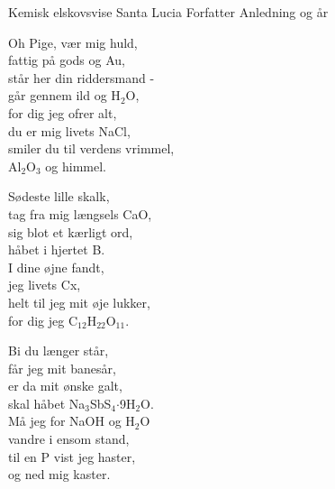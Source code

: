\begin{song}{Kemisk elskovsvise}
  {} %
  {Santa Lucia} %
  {Forfatter} %
  {Anledning og år} %
  {\NotCCLIed} %

  \begin{SBVerse}
    Oh Pige, vær mig huld,\\
    fattig på gods og Au,\\
    står her din riddersmand - \\
    går gennem ild og H$_2$O,\\
    for dig jeg ofrer alt,\\
    du er mig livets NaCl,\\
    smiler du til verdens vrimmel,\\
    Al$_2$O$_3$ og himmel.
  \end{SBVerse}

  \begin{SBVerse}
    Sødeste lille skalk,\\
    tag fra mig længsels CaO,\\
    sig blot et kærligt ord,\\
    håbet i hjertet B.\\
    I dine øjne fandt,\\
    jeg livets Cx,\\
    helt til jeg mit øje lukker,\\
    for dig jeg C$_{12}$H$_{22}$O$_{11}$.
  \end{SBVerse}

  \begin{SBVerse}
    Bi du længer står,\\
    får jeg mit banesår,\\
    er da mit ønske galt,\\
    skal håbet Na$_3$SbS$_4$$\cdot$9H$_2$O.\\
    Må jeg for NaOH og H$_2$O\\
    vandre i ensom stand,\\
    til en P vist jeg haster,\\
    og ned mig kaster.
  \end{SBVerse}
\end{song}